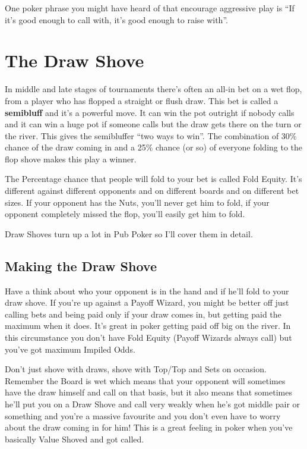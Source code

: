 One poker phrase you might have heard of that encourage aggressive play is
``If it's good enough to call with, it's good enough to raise with''.

\section{The Draw Shove}

In middle and late stages of tournaments there's often an all-in bet
on a wet flop, from a player who has flopped a straight or flush draw.
This bet is called a \textbf{semibluff} and it's a powerful move.
It can win the pot outright if nobody calls and it can win a huge pot
if someone calls but the draw gets there on the turn or the river.
This gives the semibluffer ``two ways to win''. The combination
of 30\% chance of the draw coming in and a 25\% chance (or so) of
everyone folding to the flop shove makes this play a winner.

The Percentage chance that people will fold to your bet is
called Fold Equity. It's different against different opponents
and on different boards and on different bet sizes. If your opponent has
the Nuts, you'll never get him to fold, if your opponent completely
missed the flop, you'll easily get him to fold.

Draw Shoves turn up a lot in Pub Poker so I'll cover them in detail.

\subsection{Making the Draw Shove}

Have a think about who your opponent is in the hand and if he'll
fold to your draw shove. If you're up against a Payoff Wizard,
you might be better off just calling bets and being paid only if
your draw comes in, but getting paid the maximum when it does. It's
great in poker getting paid off big on the river. In this circumstance
you don't have Fold Equity (Payoff Wizards always call) but you've got
maximum Impiled Odds.

Don't just shove with draws, shove with Top/Top and Sets on occasion.
Remember the Board is wet which means that your opponent will sometimes
have the draw himself and call on that basis, but it also means that
sometimes he'll put you on a Draw Shove and call very weakly when
he's got middle pair or something and you're a massive favourite and
you don't even have to worry about the draw coming in for him! This
is a great feeling in poker when you've basically Value Shoved and
got called.

